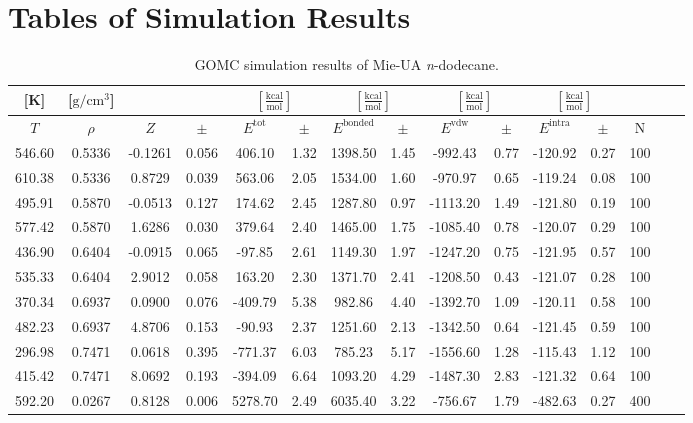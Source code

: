 \documentclass[%
 aip,
 jcp,
 sd,%
 amsmath,amssymb,
]{revtex4-1}
\begin{document}
\section{Tables of Simulation Results}
\begin{table*}[!htbp]
\centering
\caption{GOMC simulation results of Mie-UA \textit{n}-dodecane.}
\label{tab:NIST-VAL-C12-FTT}
\begin{ruledtabular}
\begin{tabular}{ccccccccccccccc}
[K] & [$\mathrm{g/cm^3}$] &  &  & \multicolumn{2}{c}{$[\frac{\mathrm{kcal}}{\mathrm{mol}}]$} & \multicolumn{2}{c}{$[\frac{\mathrm{kcal}}{\mathrm{mol}}]$} & \multicolumn{2}{c}{$[\frac{\mathrm{kcal}}{\mathrm{mol}}]$} &\multicolumn{2}{c}{$[\frac{\mathrm{kcal}}{\mathrm{mol}}]$} & \\
\hline
$T$ & $\rho$ & $Z$ & $\pm$ & $E^{\mathrm{tot}}$ & $\pm$ & $E^{\mathrm{bonded}}$ & $\pm$ & $E^{\mathrm{vdw}}$ & $\pm$ & $E^{\mathrm{intra}}$ & $\pm$ & N\\
\hline
546.60	&	0.5336	&	-0.1261	&	0.056	&	406.10	&	1.32	&	1398.50	&	1.45	&	-992.43	&	0.77	&	-120.92	&	0.27	&	100	\\
610.38	&	0.5336	&	0.8729	&	0.039	&	563.06	&	2.05	&	1534.00	&	1.60	&	-970.97	&	0.65	&	-119.24	&	0.08	&	100	\\
495.91	&	0.5870	&	-0.0513	&	0.127	&	174.62	&	2.45	&	1287.80	&	0.97	&	-1113.20	&	1.49	&	-121.80	&	0.19	&	100	\\
577.42	&	0.5870	&	1.6286	&	0.030	&	379.64	&	2.40	&	1465.00	&	1.75	&	-1085.40	&	0.78	&	-120.07	&	0.29	&	100	\\
436.90	&	0.6404	&	-0.0915	&	0.065	&	-97.85	&	2.61	&	1149.30	&	1.97	&	-1247.20	&	0.75	&	-121.95	&	0.57	&	100	\\
535.33	&	0.6404	&	2.9012	&	0.058	&	163.20	&	2.30	&	1371.70	&	2.41	&	-1208.50	&	0.43	&	-121.07	&	0.28	&	100	\\
370.34	&	0.6937	&	0.0900	&	0.076	&	-409.79	&	5.38	&	982.86	&	4.40	&	-1392.70	&	1.09	&	-120.11	&	0.58	&	100	\\
482.23	&	0.6937	&	4.8706	&	0.153	&	-90.93	&	2.37	&	1251.60	&	2.13	&	-1342.50	&	0.64	&	-121.45	&	0.59	&	100	\\
296.98	&	0.7471	&	0.0618	&	0.395	&	-771.37	&	6.03	&	785.23	&	5.17	&	-1556.60	&	1.28	&	-115.43	&	1.12	&	100	\\
415.42	&	0.7471	&	8.0692	&	0.193	&	-394.09	&	6.64	&	1093.20	&	4.29	&	-1487.30	&	2.83	&	-121.32	&	0.64	&	100	\\
592.20	&	0.0267	&	0.8128	&	0.006	&	5278.70	&	2.49	&	6035.40	&	3.22	&	-756.67	&	1.79	&	-482.63	&	0.27	&	400	\\

\end{tabular}
\end{ruledtabular}
\end{table*}
\end{document}
